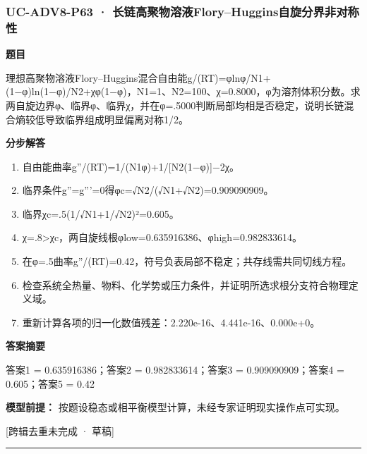 \documentclass[UTF8,11pt,a4paper]{ctexart}
\begin{document}
\subsubsection*{UC-ADV8-P63 · 长链高聚物溶液Flory–Huggins自旋分界非对称性}
\noindent\textbf{题目}\par
理想高聚物溶液Flory–Huggins混合自由能g/(RT)=φlnφ/N1+(1−φ)ln(1−φ)/N2+χφ(1−φ)，N1=1、N2=100、χ=0.8000，φ为溶剂体积分数。求两自旋边界φ、临界φ、临界χ，并在φ=.5000判断局部均相是否稳定，说明长链混合熵较低导致临界组成明显偏离对称1/2。\par
\medskip\noindent\textbf{分步解答}
\begin{enumerate}
\item 自由能曲率g''/(RT)=1/(N1φ)+1/[N2(1−φ)]−2χ。
\item 临界条件g''=g'''=0得φc=√N2/(√N1+√N2)=0.909090909。
\item 临界χc=.5(1/√N1+1/√N2)²=0.605。
\item χ=.8>χc，两自旋线根φlow=0.635916386、φhigh=0.982833614。
\item 在φ=.5曲率g''/(RT)=0.42，符号负表局部不稳定；共存线需共同切线方程。
\item 检查系统全热量、物料、化学势或压力条件，并证明所选求根分支符合物理定义域。
\item 重新计算各项的归一化数值残差：2.220e-16、4.441e-16、0.000e+0。
\end{enumerate}
\noindent\textbf{答案摘要}\par
答案1 = 0.635916386；答案2 = 0.982833614；答案3 = 0.909090909；答案4 = 0.605；答案5 = 0.42\par
\noindent\textbf{模型前提：}
按题设稳态或相平衡模型计算，未经专家证明现实操作点可实现。\par
\noindent\textcolor{red!65!black}{[跨辑去重未完成 · 草稿]} \par
\medskip\hrule\medskip
{}
\end{document}
